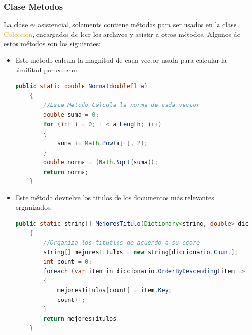 \documentclass[a4paper, 12pt]{article}
\begin{document}
\subsubsection{Clase Metodos}\label{sub;meth}
La clase es asistencial, solamente contiene métodos para ser usados en la clase \textcolor{orange}{Coleccion}, encargados de leer los archivos y asistir a otros métodos.  Algunos de estos métodos son los siguientes:
\begin{itemize}

\item Este método calcula la magnitud de cada vector usada para calcular la similitud por coseno: 
\begin{lstlisting}[language=Java]
 public static double Norma(double[] a)
    {
        //Este Metodo Calcula la norma de cada vector
        double suma = 0;
        for (int i = 0; i < a.Length; i++)
        {
            suma += Math.Pow(a[i], 2);
        }
        double norma = (Math.Sqrt(suma));
        return norma;
    }
\end{lstlisting}

\item Este método devuelve los titulos de los documentos más relevantes organizados:
\begin{lstlisting}[language=Java]
 public static string[] MejoresTitulo(Dictionary<string, double> diccionario)
    {
        //Organiza los titutlos de acuerdo a su score
        string[] mejoresTitulos = new string[diccionario.Count];
        int count = 0;
        foreach (var item in diccionario.OrderByDescending(item => item.Value))
        {
            mejoresTitulos[count] = item.Key;
            count++;
        }
        return mejoresTitulos;
    }
\end{lstlisting}


\end{itemize}
\end{document}
